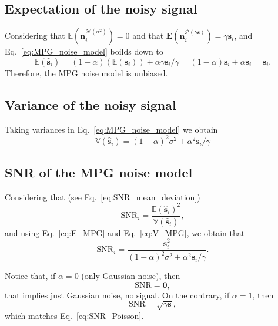 \subsection{Expectation of the noisy signal}
Considering that $\mathbb{E}(\mathbf{n}^{\mathcal{N}(\sigma^2)}_i)=0$
and that
$\mathbf{E}(\mathbf{n}^{\mathcal{P}(\gamma\mathbf{s})}_i)=\gamma\mathbf{s}_i$, and Eq.~\ref{eq:MPG_noise_model} boilds down to
\begin{equation}
  \mathbb{E}(\hat{\mathbf{s}}_i) = (1-\alpha)(\mathbb{E}(\mathbf{s}_i)) + \alpha\gamma\mathbf{s}_i/\gamma = (1-\alpha)\mathbf{s}_i + \alpha\mathbf{s}_i = \mathbf{s}_i.
  \label{eq:E_MPG}
\end{equation}
Therefore, the \gls{MPG} noise model is unbiased.

\subsection{Variance of the noisy signal}
Taking variances in Eq.~\ref{eq:MPG_noise_model} we obtain
\begin{equation}
  \mathbb{V}(\hat{\mathbf{s}}_i) = (1-\alpha)^2\sigma^2 + \alpha^2\mathbf{s}_i/\gamma
  \label{eq:V_MPG}
\end{equation}

\subsection{\gls{SNR} of the \gls{MPG} noise model}
Considering that (see Eq.~\ref{eq:SNR_mean_deviation})
\begin{equation}
  \text{SNR}_i = \frac{\mathbb{E}(\hat{\mathbf{s}}_i)^2}{\mathbb{V}(\hat{\mathbf{s}}_i)},
\end{equation}
and using Eq.~\ref{eq:E_MPG} and Eq.~\ref{eq:V_MPG}, we obtain that
\begin{equation}
  \text{SNR}_i = \frac{\mathbf{s}_i^2}{(1-\alpha)^2\sigma^2 + \alpha^2\mathbf{s}_i/\gamma}.
  \label{eq:SNR_MPG}
\end{equation}

Notice that, if $\alpha=0$ (only Gaussian noise), then
\begin{equation}
  \text{SNR} = \mathbf{0},
\end{equation}
that implies just Gaussian noise, no signal. On the contrary, if
$\alpha=1$, then
\begin{equation}
  \text{SNR} = \sqrt{\gamma\mathbf{s}},
\end{equation}
which matches Eq.~\ref{eq:SNR_Poisson}.

